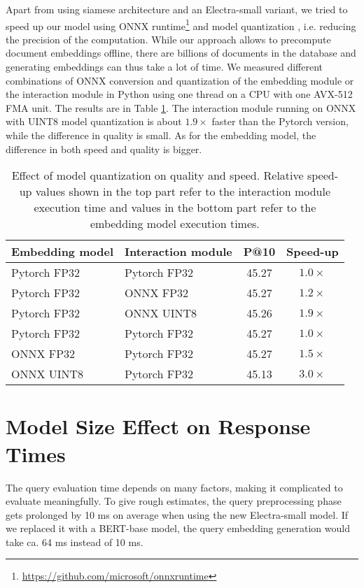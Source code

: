 \documentclass[letterpaper]{article} \usepackage{aaai22 }  \usepackage{times}  \usepackage{helvet}  \usepackage{courier}  \usepackage[hyphens]{url}  \usepackage{graphicx} \usepackage{amsmath,amsfonts,amssymb, mathabx,bm,bbm}
\begin{document}
Apart from using siamese architecture and an Electra-small variant, we tried to speed up our model using ONNX runtime\footnote{\url{https://github.com/microsoft/onnxruntime}}
and model quantization \cite{polino2018quantization}, i.e. reducing the precision of the computation. While our approach allows to precompute document embeddings offline, there are billions of documents in the database and generating embeddings can thus take a lot of time. We measured different combinations of ONNX conversion and quantization of the embedding module or the interaction module in Python using one thread on a CPU with one AVX-512 FMA unit. The results are in Table \ref{tab:quantization}. The interaction module running on ONNX with UINT8 model quantization is about $1.9\times$ faster than the Pytorch version, while the difference in quality is small. As for the embedding model, the difference in both speed and quality is bigger.

\begin{table}[!h]
    \centering\footnotesize
    \begin{tabular}{llcc}
    \toprule
        Embedding model & Interaction module & P@10 & Speed-up \\\midrule
        Pytorch FP32 & Pytorch FP32 & 45.27 & $1.0\times$\\
        Pytorch FP32 & ONNX FP32 & 45.27 & $1.2\times$\\
        Pytorch FP32 & ONNX UINT8 & 45.26 & $1.9\times$\\\midrule
        Pytorch FP32 & Pytorch FP32 & 45.27 & $1.0\times$\\
        ONNX FP32 & Pytorch FP32 & 45.27 & $1.5\times$ \\
        ONNX UINT8 & Pytorch FP32 & 45.13 & $3.0 \times$\\\bottomrule
    \end{tabular}
    \caption{Effect of model quantization on quality and speed. Relative speed-up values shown in the top part refer to the interaction module execution time and values in the bottom part refer to the embedding model execution times.}
    \label{tab:quantization}
\end{table}

\section{Model Size Effect on Response Times}

The query evaluation time depends on many factors, making it complicated to evaluate meaningfully. To give rough estimates, the query preprocessing phase gets prolonged by 10 ms on average when using the new Electra-small model. If we replaced it with a BERT-base model, the query embedding generation would take ca. 64 ms instead of 10 ms.
\end{document}
